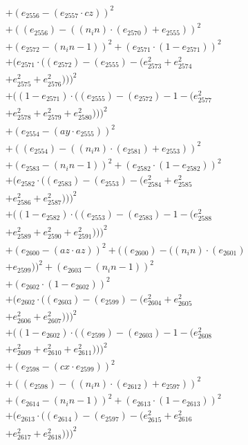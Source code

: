 \documentclass[10pt, a4paper]{article}
\begin{document}
\begin{align*}
& + (e_{2556} - (e_{2557}  \cdot  cz))^{2} \\
& + ((e_{2556}) - ((n_in)  \cdot  (e_{2570}) + e_{2555}))^{2} \\
& + (e_{2572} - (n_in - 1))^{2} + (e_{2571}  \cdot  (1 - e_{2571}))^{2} \\
& + (e_{2571}  \cdot  ((e_{2572}) - (e_{2555}) - (e_{2573}^{2} + e_{2574}^{2} \\
& + e_{2575}^{2} + e_{2576}^{2})))^{2} \\
& + ((1 - e_{2571})  \cdot  ((e_{2555}) - (e_{2572}) - 1 - (e_{2577}^{2} \\
& + e_{2578}^{2} + e_{2579}^{2} + e_{2580}^{2})))^{2} \\
& + (e_{2554} - (ay  \cdot  e_{2555}))^{2} \\
& + ((e_{2554}) - ((n_in)  \cdot  (e_{2581}) + e_{2553}))^{2} \\
& + (e_{2583} - (n_in - 1))^{2} + (e_{2582}  \cdot  (1 - e_{2582}))^{2} \\
& + (e_{2582}  \cdot  ((e_{2583}) - (e_{2553}) - (e_{2584}^{2} + e_{2585}^{2} \\
& + e_{2586}^{2} + e_{2587}^{2})))^{2} \\
& + ((1 - e_{2582})  \cdot  ((e_{2553}) - (e_{2583}) - 1 - (e_{2588}^{2} \\
& + e_{2589}^{2} + e_{2590}^{2} + e_{2591}^{2})))^{2} \\
& + (e_{2600} - (az  \cdot  az))^{2} + ((e_{2600}) - ((n_in)  \cdot  (e_{2601}) \\
& + e_{2599}))^{2} + (e_{2603} - (n_in - 1))^{2} \\
& + (e_{2602}  \cdot  (1 - e_{2602}))^{2} \\
& + (e_{2602}  \cdot  ((e_{2603}) - (e_{2599}) - (e_{2604}^{2} + e_{2605}^{2} \\
& + e_{2606}^{2} + e_{2607}^{2})))^{2} \\
& + ((1 - e_{2602})  \cdot  ((e_{2599}) - (e_{2603}) - 1 - (e_{2608}^{2} \\
& + e_{2609}^{2} + e_{2610}^{2} + e_{2611}^{2})))^{2} \\
& + (e_{2598} - (cx  \cdot  e_{2599}))^{2} \\
& + ((e_{2598}) - ((n_in)  \cdot  (e_{2612}) + e_{2597}))^{2} \\
& + (e_{2614} - (n_in - 1))^{2} + (e_{2613}  \cdot  (1 - e_{2613}))^{2} \\
& + (e_{2613}  \cdot  ((e_{2614}) - (e_{2597}) - (e_{2615}^{2} + e_{2616}^{2} \\
& + e_{2617}^{2} + e_{2618}^{2})))^{2} \\

\end{align*}
\end{document}
